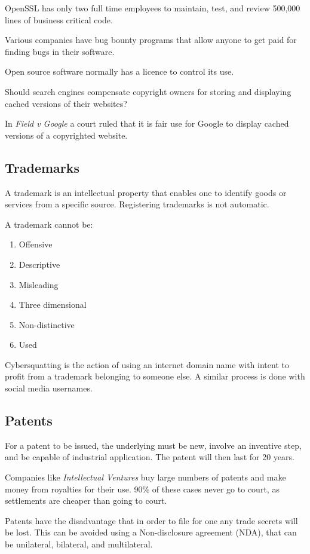 OpenSSL has only two full time employees to maintain, test, and review 500,000 lines of business critical code.

Various companies have bug bounty programs that allow anyone to get paid for finding bugs in their software.

Open source software normally has a licence to control its use.

\begin{example}
    Should search engines compensate copyright owners for storing and displaying cached versions of their websites?

    In \emph{Field v Google} a court ruled that it is fair use for Google to display cached versions of a copyrighted website.
\end{example}

\subsection{Trademarks}
A trademark is an intellectual property that enables one to identify goods or services from a specific source. Registering trademarks is not automatic.

A trademark cannot be:
\begin{enumerate}
    \item Offensive
    \item Descriptive
    \item Misleading
    \item Three dimensional
    \item Non-distinctive
    \item Used
\end{enumerate}
Cybersquatting is the action of using an internet domain name with intent to profit from a trademark belonging to someone else. A similar process is done with social media usernames.

\subsection{Patents}
For a patent to be issued, the underlying must be new, involve an inventive step, and be capable of industrial application. The patent will then last for 20 years.

Companies like \emph{Intellectual Ventures} buy large numbers of patents and make money from royalties for their use. 90\% of these cases never go to court, as settlements are cheaper than going to court.

Patents have the disadvantage that in order to file for one any trade secrets will be lost. This can be avoided using a Non-disclosure agreement (NDA), that can be unilateral, bilateral, and multilateral.
